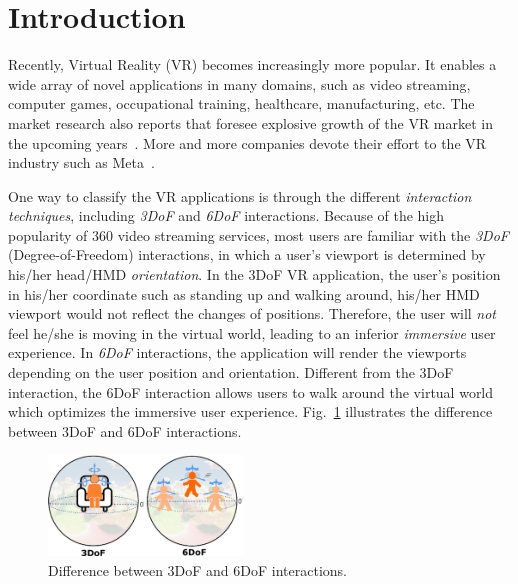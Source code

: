 \section{Introduction} \label{sec:intro}

Recently, Virtual Reality (VR) becomes increasingly more popular.
It enables a wide array of novel applications in many domains, such as video streaming, computer games, occupational training, healthcare, manufacturing, etc.
The market research also reports that foresee explosive growth of the VR market in the upcoming years~\cite{XR_market}.
More and more companies devote their effort to the VR industry such as Meta~\cite{Meta}.

One way to classify the VR applications is through the different {\em interaction techniques}, including {\em 3DoF} and {\em 6DoF} interactions.
Because of the high popularity of 360{\degree} video streaming services, most users are familiar with the {\em 3DoF} (Degree-of-Freedom) interactions, in which a user's viewport is determined by his/her head/HMD {\em orientation}.
In the 3DoF VR application, the user's position in his/her coordinate such as standing up and walking around, his/her HMD viewport would not reflect the changes of positions.
Therefore, the user will {\em not} feel he/she is moving in the virtual world, leading to an inferior {\em immersive} user experience.
In {\em 6DoF} interactions, the application will render the viewports depending on the user position and orientation. 
Different from the 3DoF interaction, the 6DoF interaction allows users to walk around the virtual world which optimizes the immersive user experience.
Fig.~\ref{fig:vr_phase} illustrates the difference between 3DoF and 6DoF interactions.

\begin{figure}[tbh]
    \centering
    \includegraphics[width=0.46\textwidth]{figs/vr_phase}
    \caption{Difference between 3DoF and 6DoF interactions.}
    \label{fig:vr_phase}
\end{figure}

